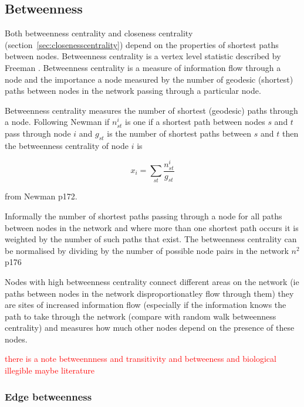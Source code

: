 \subsection{Betweenness}
\label{sec:Betweeness centrality}
Both betweenness centrality and closeness centrality (section~\ref{sec:closenesscentrality}) depend on the properties of shortest paths between nodes. Betweenness centrality is a vertex level statistic described by Freeman \cite{freeman1977set}. Betweenness centrality is a measure of information flow through a node and the importance a node measured by the number of geodesic (shortest) paths between nodes in the network passing through a particular node. 

Betweenness centrality measures the number of shortest (geodesic) paths through a node. Following Newman if $n_{st}^i$ is one if a shortest path between nodes $s$ and $t$ pass through node $i$ and $g_{st}$ is the number of shortest paths between $s$ and $t$ then the betweenness centrality of node $i$ is

\begin{equation}
    x_i = \sum_{st} \frac{n_{st}^i}{g_{st}}
\end{equation}
\label{eq: Betweenness centrality}

from Newman \cite{newman2018networks} p172. 

Informally the number of shortest paths passing through a node for all paths between nodes in the network and where more than one shortest path occurs it is weighted by the number of such paths that exist. The betweenness centrality can be normalised by dividing by the number of possible node pairs in the network $n^2$ \cite{newman2018networks} p176

Nodes with high betweenness centrality connect different areas on the network (ie paths between nodes in the network disproportionatley flow through them) they are sites of increased information flow (especially if the information knows the path to take through the network (compare with random walk betweenness centrality) and measures how much other nodes depend on the presence of these nodes.


\textcolor{red}{there is a note betweennness and transitivity and betweeness and biological illegible maybe literature}
 
\subsubsection{Edge betweenness}


